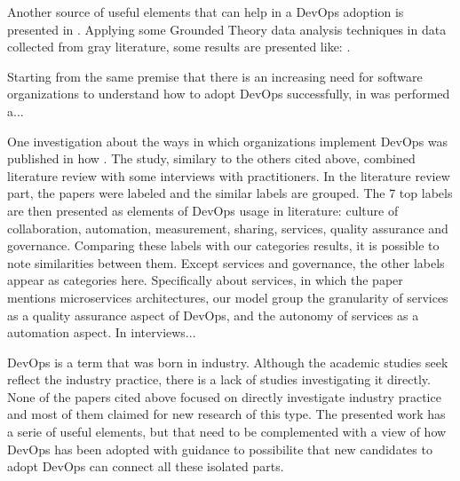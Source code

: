 Another source of useful elements that can help in a DevOps adoption is
presented in \cite{characterizing_devops_sbes_2016}. Applying some Grounded
Theory data analysis techniques in data collected from gray literature, some
results are presented like: .


Starting from the same premise that there is an increasing need for software
organizations to understand how to adopt DevOps successfully, in
\cite{devops_a_definition_xp_15} was performed a...

One investigation about the ways in which organizations implement DevOps was
published in how \cite{a_qualitative_study_journal_sw_17}. The study, similary
to the others cited above, combined literature review with some interviews with
practitioners. In the literature review part, the papers were labeled and the
similar labels are grouped. The 7 top labels are then presented as elements of
DevOps usage in literature: culture of collaboration, automation, measurement,
sharing, services, quality assurance and governance. Comparing these labels with
our categories results, it is possible to note similarities between them. Except
services and governance, the other labels appear as categories here.
Specifically about services, in which the paper mentions microservices
architectures, our model group the granularity of services as a quality
assurance aspect of DevOps, and the autonomy of services as a automation aspect.
In interviews...

DevOps is a term that was born in industry. Although the academic studies seek
reflect the industry practice, there is a lack of studies investigating it
directly. None of the papers cited above focused on directly investigate
industry practice and most of them claimed for new research of this type. The
presented work has a serie of useful elements, but that need to be complemented
with a view of how DevOps has been adopted with guidance to possibilite that
new candidates to adopt DevOps can connect all these isolated parts.

